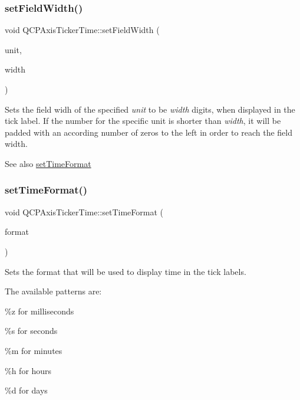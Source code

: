 \subsubsection{\texorpdfstring{set\+Field\+Width()}{setFieldWidth()}}
{\footnotesize\ttfamily void Q\+C\+P\+Axis\+Ticker\+Time\+::set\+Field\+Width (\begin{DoxyParamCaption}\item[{\hyperlink{classQCPAxisTickerTime_a5c48ded8c6d3a1aca9b68219469fea3e}{Q\+C\+P\+Axis\+Ticker\+Time\+::\+Time\+Unit}}]{unit,  }\item[{int}]{width }\end{DoxyParamCaption})}

Sets the field widh of the specified {\itshape unit} to be {\itshape width} digits, when displayed in the tick label. If the number for the specific unit is shorter than {\itshape width}, it will be padded with an according number of zeros to the left in order to reach the field width.

\begin{DoxySeeAlso}{See also}
\hyperlink{classQCPAxisTickerTime_a2f30b6e5125bce4256be9ce3177088ea}{set\+Time\+Format} 
\end{DoxySeeAlso}
\mbox{\label{classQCPAxisTickerTime_a2f30b6e5125bce4256be9ce3177088ea}} 
\subsubsection{\texorpdfstring{set\+Time\+Format()}{setTimeFormat()}}
{\footnotesize\ttfamily void Q\+C\+P\+Axis\+Ticker\+Time\+::set\+Time\+Format (\begin{DoxyParamCaption}\item[{const Q\+String \&}]{format }\end{DoxyParamCaption})}

Sets the format that will be used to display time in the tick labels.

The available patterns are\+:
\begin{DoxyItemize}
\item \%z for milliseconds
\item \%s for seconds
\item \%m for minutes
\item \%h for hours
\item \%d for days
\end{DoxyItemize}

